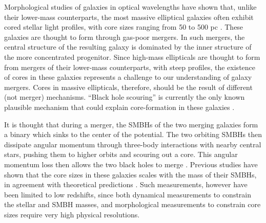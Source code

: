 \documentclass[chicago]{emulateapj}
\begin{document}
Morphological studies of galaxies in optical wavelengths have shown that, unlike their lower-mass counterparts, the most massive elliptical galaxies often exhibit cored stellar light profiles, with core sizes ranging from 50 to 500 pc \citep[e.g.,][]{Ferrarese:06}. 
These galaxies are thought to form through gas-poor mergers. In such mergers, the central structure of the resulting galaxy is dominated by the inner structure of the more concentrated progenitor.  Since high-mass ellipticals are thought to form from mergers of their lower-mass counterparts, with steep profiles, the existence of cores in these galaxies represents a challenge to our understanding of galaxy mergers. Cores in massive ellipticals, therefore, should be the result of different (not merger) mechanisms.  
``Black hole scouring'' is currently the only known plausible mechanism that could explain core-formation in these galaxies \citep{Thomas:14}.

It is thought that during a merger, the SMBHs of the two merging galaxies form a binary which sinks to the center of the potential. The two orbiting SMBHs then dissipate angular momentum through three-body interactions with nearby central stars, pushing them to higher orbits and scouring out a core. This angular momentum loss then allows the two black holes to merge \citep{Begelman:80}.
Previous studies have shown that the core sizes in these galaxies scales with the mass of their SMBHs, in agreement with theoretical predictions \citep{Kormendy:09,Kormendy:13}.
Such measurements, however have been limited to low redshifts, since both dynamical measurements to constrain the stellar and SMBH masses, and morphological measurements to constrain core sizes require very high physical resolutions. 
\end{document}
